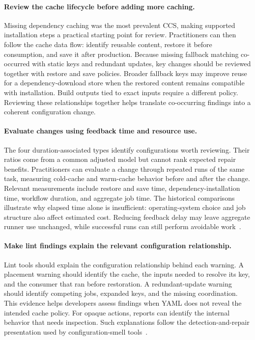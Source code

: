 \documentclass[smallextended]{svjour3}
\begin{document}
\paragraph{Review the cache lifecycle before adding more caching.}
Missing dependency caching was the most prevalent CCS, making supported installation steps a practical starting point for review. Practitioners can then follow the cache data flow: identify reusable content, restore it before consumption, and save it after production. Because missing fallback matching co-occurred with static keys and redundant updates, key changes should be reviewed together with restore and save policies. Broader fallback keys may improve reuse for a dependency-download store when the restored content remains compatible with installation. Build outputs tied to exact inputs require a different policy. Reviewing these relationships together helps translate co-occurring findings into a coherent configuration change.

\paragraph{Evaluate changes using feedback time and resource use.}
The four duration-associated types identify configurations worth reviewing. Their ratios come from a common adjusted model but cannot rank expected repair benefits. Practitioners can evaluate a change through repeated runs of the same task, measuring cold-cache and warm-cache behavior before and after the change. Relevant measurements include restore and save time, dependency-installation time, workflow duration, and aggregate job time. The historical comparisons illustrate why elapsed time alone is insufficient: operating-system choice and job structure also affect estimated cost. Reducing feedback delay may leave aggregate runner use unchanged, while successful runs can still perform avoidable work~\citep{bouzenia2024resource,ghaleb2026cachingreality}.

\paragraph{Make lint findings explain the relevant configuration relationship.}
Lint tools should explain the configuration relationship behind each warning. A placement warning should identify the cache, the inputs needed to resolve its key, and the consumer that ran before restoration. A redundant-update warning should identify competing jobs, expanded keys, and the missing coordination. This evidence helps developers assess findings when YAML does not reveal the intended cache policy. For opaque actions, reports can identify the internal behavior that needs inspection. Such explanations follow the detection-and-repair presentation used by configuration-smell tools~\citep{zhang2022buildsonic,urdih2026cache}.
\end{document}
